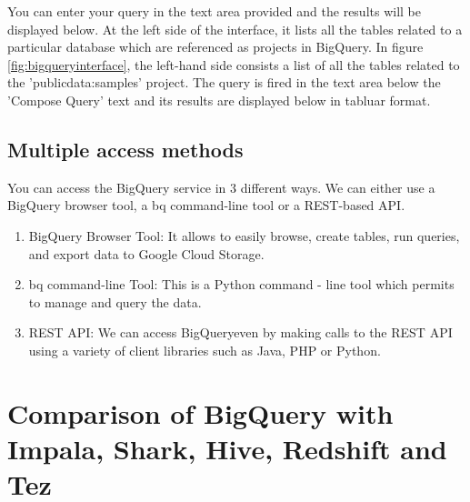 \documentclass[9pt,twocolumn,twoside]{../../styles/osajnl}
\begin{document}
\noindent
You can enter your query in the text area provided and the results
will be displayed below. At the left side of the interface, it lists
all the tables related to a particular database which are referenced
as projects in BigQuery. In figure \ref{fig:bigqueryinterface}, the
left-hand side consists a list of all the tables related to the
'publicdata:samples' project. The query is fired in the text area
below the 'Compose Query' text and its results are displayed below in
tabluar format.

\subsection{Multiple access methods}
You can access the BigQuery service in 3 different ways. We can either
use a BigQuery browser tool, a bq command-line tool or a REST-based
API. \begin{enumerate}
\item BigQuery Browser Tool: It allows to easily browse, create
  tables, run queries, and export data to Google Cloud Storage.
\item bq command-line Tool: This is a Python command - line tool which
  permits to manage and query the data. \item REST API: We can access
  BigQueryeven by making calls to the REST API using a variety of
  client libraries such as Java, PHP or Python.  \end{enumerate}

\section{Comparison of BigQuery with Impala, Shark, Hive, Redshift and Tez}
\end{document}
